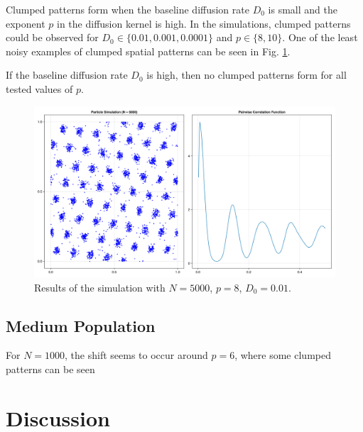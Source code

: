 \documentclass{article}
\begin{document}
Clumped patterns form when the baseline diffusion rate $D_0$ is small and the exponent $p$ in the diffusion kernel is high. 
In the simulations, clumped patterns could be observed for $D_0 \in \{0.01, 0.001, 0.0001\}$ and $p\in\{8, 10\}$.
One of the least noisy examples of clumped spatial patterns can be seen in Fig. \ref{rp68}.

If the baseline diffusion rate $D_0$ is high, then no clumped patterns form for all tested values of $p$. 
\begin{figure}
    \label{rp68}
    \includegraphics[width=1.0\linewidth]{img/rp68_N5000_D01_p8.png}
    \caption{Results of the simulation with $N=5000$, $p=8$, $D_0=0.01$.}
\end{figure}

\subsection{Medium Population}

For $N=1000$, the shift seems to occur around $p=6$, where some clumped patterns can be seen 
\section{Discussion}
\printbibliography
\end{document}
